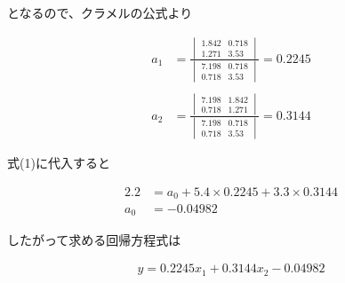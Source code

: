 \documentclass[dvipdfmx,autodetect-engine,titlepage]{jsarticle}
\begin{document}
となるので、クラメルの公式より

\begin{align*}
  a_1 &= \frac{\begin{vmatrix}1.842 & 0.718 \\1.271 & 3.53 \end{vmatrix}}{\begin{vmatrix}7.198 & 0.718 \\ 0.718 & 3.53 \end{vmatrix}} = 0.2245 \\\\
  a_2 &= \frac{\begin{vmatrix}7.198 & 1.842 \\0.718 & 1.271 \end{vmatrix}}{\begin{vmatrix}7.198 & 0.718 \\ 0.718 & 3.53 \end{vmatrix}} = 0.3144
\end{align*}

式(1)に代入すると

\begin{align*}
  2.2 &= a_0 + 5.4 \times 0.2245 + 3.3 \times 0.3144 \\
  a_0 &= -0.04982
\end{align*}

したがって求める回帰方程式は

\begin{align*}
  y = 0.2245x_1 + 0.3144x_2 - 0.04982
\end{align*}
\end{document}
